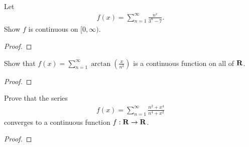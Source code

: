 \documentclass[11pt,twoside,openany]{memoir}
\begin{document}
\newpage
\fancyhead[L]{\scalebox{0.9}{Series of Functions}}
\fancyhead[R]{\scalebox{0.9}{Appeared on: S24}}
\begin{problem}
    Let
    \begin{equation*}
    \begin{split}
        f(x) = \sum_{n = 1}^\infty \frac{n^x}{3^n - 7}.
    \end{split}
    \end{equation*}
    Show $f$ is continuous on $[0,\infty)$.
\end{problem}
\begin{proof}
\end{proof}

\newpage
\fancyhead[L]{\scalebox{0.9}{Series of Functions}}
\fancyhead[R]{\scalebox{0.9}{Appeared on: W24}}
\begin{problem}
    Show that $f(x) = \sum_{n = 1}^\infty \arctan \left( \frac{x}{n^2} \right)$ is a continuous function on all of $\mathbf{R}$.
\end{problem}
\begin{proof}
\end{proof}

\newpage
\fancyhead[L]{\scalebox{0.9}{Series of Functions}}
\fancyhead[R]{\scalebox{0.9}{Appeared on: F23}}
\begin{problem}
    Prove that the series
    \begin{equation*}
    \begin{split}
        f(x) = \sum_{n = 1}^\infty \frac{n^2 + x^4}{n^4 + x^2}
    \end{split}
    \end{equation*}
    converges to a continuous function $f:\mathbf{R} \rightarrow \mathbf{R}$.
\end{problem}
\begin{proof}
\end{proof}
\end{document}
